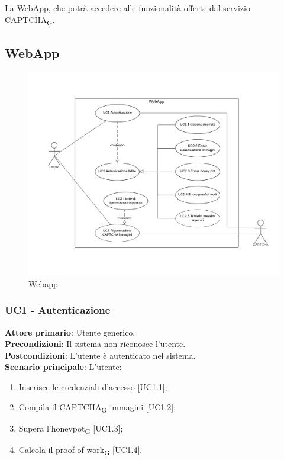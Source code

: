 La WebApp, che potrà accedere alle funzionalità offerte dal servizio CAPTCHA\textsubscript{G}. \\

\subsection{WebApp}

\begin{figure}[H]
    \centering
    \includegraphics[scale=0.4]{img/web_app.png}
    \caption{Webapp}
\end{figure}

\subsubsection{UC1 - Autenticazione}
\textbf{Attore primario}: Utente generico.\\
\textbf{Precondizioni}: Il sistema non riconosce l'utente.\\
\textbf{Postcondizioni}: L'utente è autenticato nel sistema.\\

\textbf{Scenario principale}: L'utente:
\begin{enumerate}
\item Inserisce le credenziali d'accesso [UC1.1];
\item Compila il CAPTCHA\textsubscript{G} immagini [UC1.2];
\item Supera l'honeypot\textsubscript{G} [UC1.3];
\item Calcola il proof of work\textsubscript{G} [UC1.4].
\end{enumerate}

